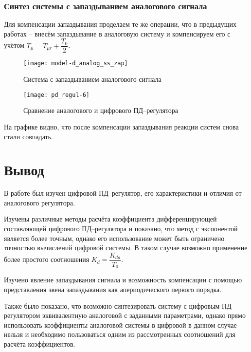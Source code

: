             \subsubsection{Синтез системы с запаздыванием аналогового сигнала}
                Для компенсации запаздывания проделаем те же операции, что в предыдущих работах -- внесём запаздывание в аналоговую систему и компенсируем его с учётом $ T_\mu = T_{\mu r} + \dfrac{T_0}{2} $.
                \begin{figure}[H]
                    \centering\texttt{[image: model-d\_analog\_ss\_zap]}
                    \caption{Система с запаздыванием аналогового сигнала}
                \end{figure}
                \begin{figure}[H]
                    \centering\texttt{[image: pd\_regul-6]}
                    \caption{Сравнение аналогового и цифрового ПД--регулятора}
                \end{figure}
                На графике видно, что после компенсации запаздывания реакции систем снова стали совпадать.

    \section{Вывод}
        В работе был изучен цифровой ПД--регулятор, его характеристики и отличия от аналогового регулятора.
        
        Изучены различные методы расчёта коэффициента дифференцирующей составляющей цифрового ПД--регулятора и показано, что метод с экспонентой является более точным, однако его использование может быть ограничено точностью вычислений цифровой системы. В таком случае возможно применение более простого соотношения $ K_d = \dfrac{K_{da}}{T_0} $.
        
        Изучено явление запаздывания сигнала и возможность компенсации с помощью представления звена запаздывания как
        апериодического первого порядка.
        
        Также было показано, что возможно синтезировать систему с цифровым ПД--регулятором эквивалентную
        аналоговой с заданными параметрами, однако прямо использовать коэффициенты аналоговой системы в цифровой в данном случае нельзя и необходимо пользоваться одним из рассмотренных соотношений для расчёта коэффициентов.

